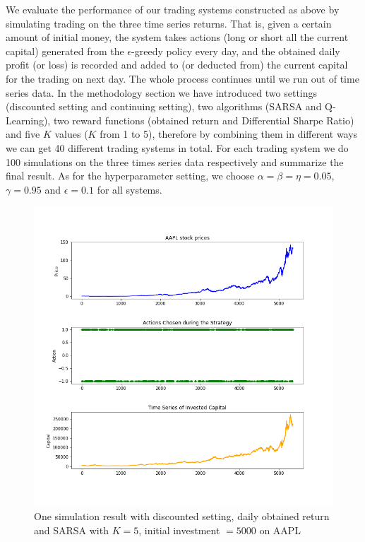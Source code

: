 \documentclass{article}
\begin{document}
\noindent We evaluate the performance of our trading systems constructed as above by simulating trading on the three time series returns. That is, given a certain amount of initial money, the system takes actions (long or short all the current capital) generated from the $\epsilon$-greedy policy every day, and the obtained daily profit (or loss) is recorded and added to (or deducted from) the current capital for the trading on next day. The whole process continues until we run out of time series data. 
\indent In the methodology section we have introduced two settings (discounted setting and continuing setting), two algorithms (SARSA and Q-Learning), two reward functions (obtained return and Differential Sharpe Ratio) and five $K$ values ($K$ from 1 to 5), therefore by combining them in different ways we can get 40 different trading systems in total. For each trading system we do 100 simulations on the three times series data respectively and summarize the final result. As for the hyperparameter setting, we choose $\alpha = \beta = \eta = 0.05$, $\gamma = 0.95$ and $\epsilon = 0.1$ for all systems.


\begin{figure}[H]
	\centering
	\includegraphics[scale=0.4]{figs/figure1.png}
	\caption{One simulation result with discounted setting, daily obtained return and SARSA with $K = 5$, initial investment $= 5000$ on AAPL} 
	\label{figure1}
\end{figure}
\end{document}
